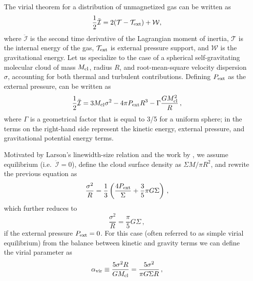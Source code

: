 \IfFileExists{emulateapjlegacy.cls}{\documentclass[iop]{emulateapjlegacy}}{\documentclass[iop]{emulateapj}}
\begin{document}
     The virial theorem for a distribution of unmagnetized gas can be written as \citep{McKee1992}
\begin{equation}\label{eqn:virial_th_general}
\frac{1}{2}\ddot{\mathcal{I}} = 2(\mathcal{T} - \mathcal{T}_{\rm ext}) + \mathcal{W},
\end{equation}
where $\ddot{\mathcal{I}}$ is the second time derivative of the Lagrangian moment of inertia, $\mathcal{T}$ is the internal energy of the gas, $\mathcal{T}_{\rm ext}$ is external pressure support, and $\mathcal{W}$ is the gravitational energy.
%
Let us specialize to the case of a spherical self-gravitating molecular cloud of mass $M_{\rm cl}$, radius $R$, and root-mean-square velocity dispersion $\sigma$, accounting for both thermal and turbulent contributions. 
Defining $P_{\rm ext}$ as the external pressure,  can be written as
\begin{equation}
\frac{1}{2}{\ddot{\mathcal{I}}} = 3 M_{\rm cl} \sigma^2 - 4\pi P_{\rm ext} R^3 - \Gamma\frac{GM_{\rm cl}^2}{R}\,,
\label{eqn:virial}
\end{equation}
where $\Gamma$ is a geometrical factor that is equal to 3/5 for a uniform sphere; in  the terms on the right-hand side represent the
    kinetic energy, external pressure, and gravitational potential energy terms.

Motivated by Larson's linewidth-size relation \citep{Larson81a} and the work by \citet{Heyer09a}, we assume equilibrium (i.e.\ ${\ddot{\mathcal{I}}}=0$), define the cloud surface density as
$\Sigma$\eq$M/\pi R^2$, and rewrite the previous equation as 
\begin{equation}
\frac{\sigma^2}{R} = \frac{1}{3}\left(\frac{4P_{\rm ext}}{\Sigma} + \frac{3}{5} \pi G \Sigma \right)\,,
\label{eqn:v0}
\end{equation}
which further reduces to 
\begin{equation}
\frac{\sigma^2}{R} = \frac{\pi}{5} G \Sigma\,,
\label{eqn:SVE}
\end{equation}
if the external pressure $P_{\rm ext}=0$. For this case (often referred to as simple virial equilibrium) from the balance between kinetic and gravity terms we can define the virial parameter as 
\begin{equation}
\alpha_{\rm vir} \equiv  \frac{5\sigma^2R}{GM_{\rm cl}} = \frac{5\sigma^2}{\pi G \Sigma R}\,,
\label{eqn:alpha}
\end{equation}
\end{document}
